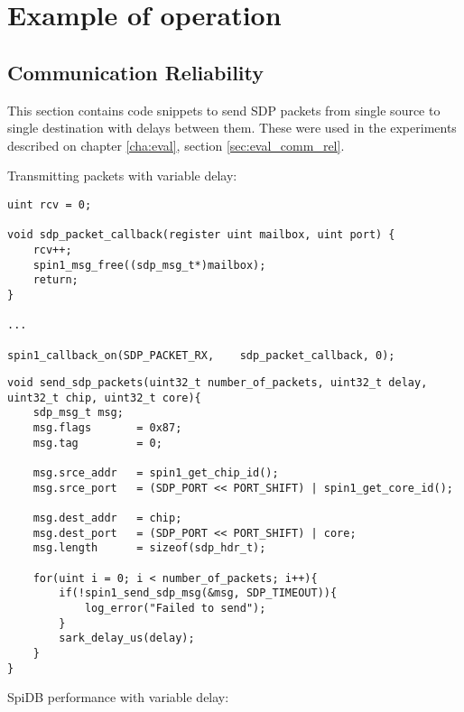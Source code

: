 \chapter{Example of operation}

\section{Communication Reliability}
\label{sec:appendix_comm_rel}

This section contains code snippets to send SDP packets from single source to single destination with delays between them. These were used in the experiments described on chapter \ref{cha:eval}, section \ref{sec:eval_comm_rel}.

Transmitting packets with variable delay:

\begin{lstlisting}[caption={Source}]
uint rcv = 0;

void sdp_packet_callback(register uint mailbox, uint port) {
    rcv++;
    spin1_msg_free((sdp_msg_t*)mailbox);
    return;
}

...

spin1_callback_on(SDP_PACKET_RX,    sdp_packet_callback, 0);

\end{lstlisting}

\begin{lstlisting}[caption={Destination}]
void send_sdp_packets(uint32_t number_of_packets, uint32_t delay, uint32_t chip, uint32_t core){
	sdp_msg_t msg;
    msg.flags       = 0x87;
    msg.tag         = 0;

    msg.srce_addr   = spin1_get_chip_id();
    msg.srce_port   = (SDP_PORT << PORT_SHIFT) | spin1_get_core_id();

    msg.dest_addr   = chip;
    msg.dest_port   = (SDP_PORT << PORT_SHIFT) | core;
    msg.length 		= sizeof(sdp_hdr_t);

    for(uint i = 0; i < number_of_packets; i++){
    	if(!spin1_send_sdp_msg(&msg, SDP_TIMEOUT)){
        	log_error("Failed to send");
        }
        sark_delay_us(delay);
    }
}
\end{lstlisting}

SpiDB performance with variable delay:

